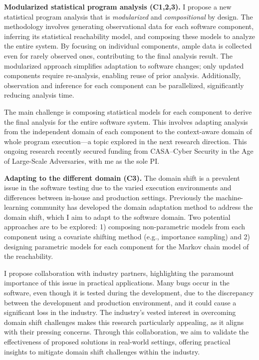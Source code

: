 \documentclass{article}
\begin{document}
\vspace{0.5em}
\noindent\textbf{Modularized statistical program analysis (C1,2,3).}
I propose a new statistical program analysis that is \emph{modularized} and \emph{compositional} by design. The methodology involves generating observational data for each software component, inferring its statistical reachability model, and composing these models to analyze the entire system. By focusing on individual components, ample data is collected even for rarely observed ones, contributing to the final analysis result. The modularized approach simplifies adaptation to software changes; only updated components require re-analysis, enabling reuse of prior analysis. Additionally, observation and inference for each component can be parallelized, significantly reducing analysis time.

The main challenge is composing statistical models for each component to derive the final analysis for the entire software system. This involves adapting analysis from the independent domain of each component to the context-aware domain of whole program execution—a topic explored in the next research direction. This ongoing research recently secured funding from CASA--{\footnotesize Cyber Security in the Age of Large-Scale Adversaries}, with me as the sole PI.

\vspace{0.5em}
\noindent\textbf{Adapting to the different domain (C3).}
The domain shift is a prevalent issue in the software testing due to the varied execution environments and differences between in-house and production settings. Previously the machine-learning community has developed the domain adaptation method to address the domain shift, which I aim to adapt to the software domain. Two potential approaches are to be explored: 1) composing non-parametric models from each component using a covariate shifting method (e.g., importance sampling) and 2) designing parametric models for each component for the Markov chain model of the reachability.

I propose collaboration with industry partners, highlighting the paramount importance of this issue in practical applications. Many bugs occur in the software, even though it is tested during the development, due to the discrepancy between the development and production environment, and it could cause a significant loss in the industry.
The industry's vested interest in overcoming domain shift challenges makes this research particularly appealing, as it aligns with their pressing concerns. Through this collaboration, we aim to validate the effectiveness of proposed solutions in real-world settings, offering practical insights to mitigate domain shift challenges within the industry.
\end{document}
